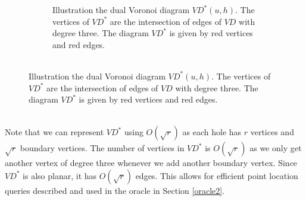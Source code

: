 \begin{figure}
\begin{subfigure}[b]{0.45\textwidth}
    \caption{Illustration the dual Voronoi diagram $VD^*(u,h)$. The vertices of
      $VD^*$ are the intersection of edges of $VD$ with degree three. The diagram $VD^*$
    is given by red vertices and red edges.\\ \\}
    \label{awvd2}
  \end{subfigure}
  \label{awvd}
\end{figure}
Note that we can represent $VD^*$ using $O(\sqrt{r})$ as each hole has $r$ vertices and
$\sqrt{r}$ boundary vertices. The number of vertices in $VD^*$ is $O(\sqrt{r})$ as we
only get another vertex of degree three whenever we add another boundary vertex. Since
$VD^*$ is also planar, it has $O(\sqrt{r})$ edges. This allows for efficient point
location queries described and used in the oracle in Section \ref{oracle2}.
